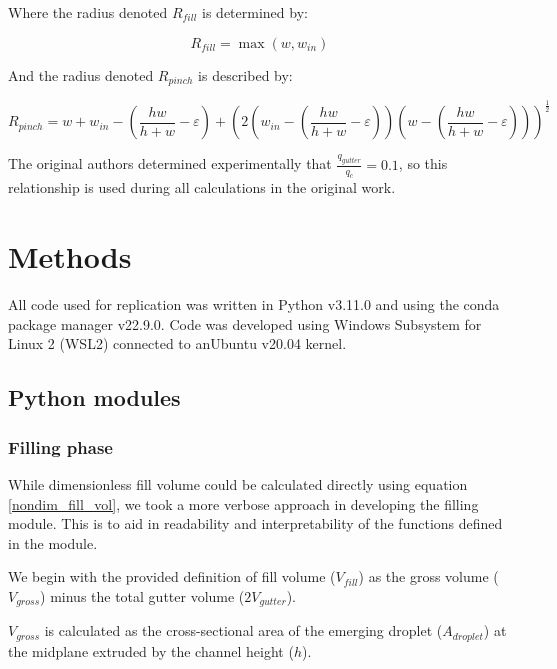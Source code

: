 Where the radius denoted $R_{fill}$ is determined by:

\begin{equation}
  R_{fill} = \max\left(w,w_{in}\right)\label{R_fill}
\end{equation}

And the radius denoted $R_{pinch}$ is described by:

\begin{equation}
  R_{pinch} = w + w_{in} - \left(\frac{hw}{h+w} - \varepsilon\right) +
  \left(2\left(w_{in} -
    \left(\frac{hw}{h+w} -
    \varepsilon\right)\right)\left(w -
    \left(\frac{hw}{h+w} - \varepsilon\right)\right)\right)^\frac{1}{2}\label{R_pinch}
\end{equation}


The original authors determined experimentally that $\frac{q_{gutter}}{q_c}=0.1$,
so this relationship is used during all calculations in the original work.

\section{Methods}

All code used for replication was written in Python\supercite{pypi_python_nodate}
v3.11.0 and using the conda\supercite{noauthor_conda_2017} package manager v22.9.0.
Code was developed using Windows Subsystem for Linux 2 (WSL2)\supercite{microsoft_windows_nodate}
connected to anUbuntu\supercite{canonical_ltd_ubuntu_2020} v20.04 kernel.

\subsection{Python modules}

\subsubsection{Filling phase}

While dimensionless fill volume could be calculated directly using equation \eqref{nondim_fill_vol},
we took a more verbose approach in developing the filling module. This is to aid in readability and
interpretability of the functions defined in the module.

We begin with the provided definition of fill volume ($V_{fill}$) as the gross volume
($V_{gross}$) minus the total gutter volume ($2V_{gutter}$).

$V_{gross}$ is calculated as the cross-sectional area of the emerging droplet ($A_{droplet}$)
at the midplane extruded by the channel height ($h$).

